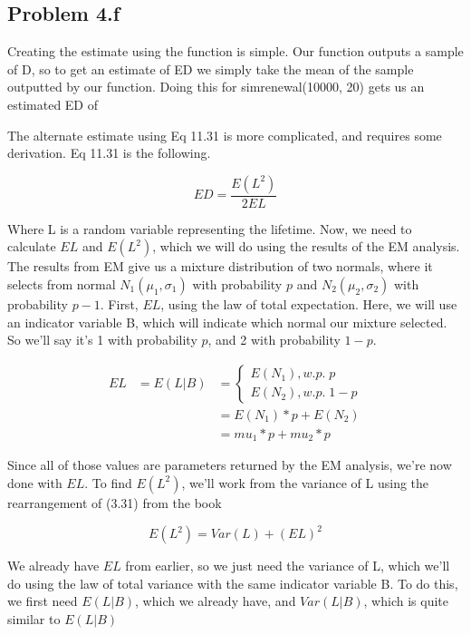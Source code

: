 \documentclass[letter]{article}
\begin{document}
\subsection*{Problem 4.f}

Creating the estimate using the function is simple. Our function outputs a sample of D, so to get an estimate of ED we simply take the mean of the sample outputted by our function. Doing this for simrenewal(10000, 20) gets us an estimated ED of 

The alternate estimate using Eq 11.31 is more complicated, and requires some derivation. Eq 11.31 is the following.

\begin{equation}
	ED = \frac{E(L^2)}{2EL}
\end{equation}

Where L is a random variable representing the lifetime. Now, we need to calculate $EL$ and $E(L^2)$, which we will do using the results of the EM analysis. The results from EM give us a mixture distribution of two normals, where it selects from normal $N_1(\mu_1, \sigma_1)$ with probability $p$ and $N_2(\mu_2, \sigma_2)$ with probability $p-1$. First, $EL$, using the law of total expectation. Here, we will use an indicator variable B, which will indicate which normal our mixture selected. So we'll say it's 1 with probability $p$, and 2 with probability $1-p$.

\begin{equation}
\begin{aligned}
	EL &= E(L | B) &=  	\begin{cases}
					E(N_1),  w.p. \; p \\
					E(N_2),  w.p. \;1-p
				\end{cases}  \\
	&&= E(N_1) * p + E(N_2) \\
	&&= mu_1 * p + mu_2 * p
\end{aligned}
\end{equation}

Since all of those values are parameters returned by the EM analysis, we're now done with $EL$. To find $E(L^2)$, we'll work from the variance of L using the rearrangement of (3.31) from the book

\begin{equation}
	E(L^2) = Var(L) + (EL)^2
\end{equation}

We already have $EL$ from earlier, so we just need the variance of L, which we'll do using the law of total variance with the same indicator variable B. To do this, we first need $E(L|B)$, which we already have, and $Var(L|B)$, which is quite similar to $E(L|B)$
\end{document}
